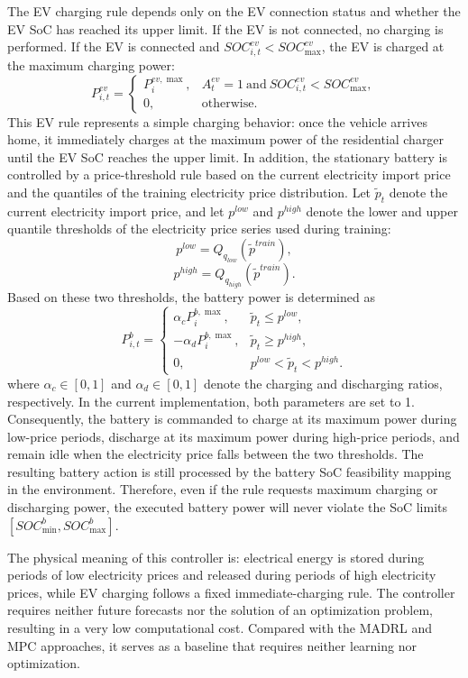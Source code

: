 The EV charging rule depends only on the EV connection status and whether the EV SoC has reached its upper limit. If the EV is not connected, no charging is performed. If the EV is connected and \(SOC^{ev}_{i,t}<SOC^{ev}_{\max}\), the EV is charged at the maximum charging power:
\[
P^{ev}_{i,t}=
\left\{
\begin{array}{ll}
P^{ev,\max}_i, & A^{ev}_t=1\ \mathrm{and}\ SOC^{ev}_{i,t}<SOC^{ev}_{\max},\\
0, & \mathrm{otherwise}.
\end{array}
\right.
\]
This EV rule represents a simple charging behavior: once the vehicle arrives home, it immediately charges at the maximum power of the residential charger until the EV SoC reaches the upper limit. In addition, the stationary battery is controlled by a price-threshold rule based on the current electricity import price and the quantiles of the training electricity price distribution. Let \(\tilde p_t\) denote the current electricity import price, and let \(p^{low}\) and \(p^{high}\) denote the lower and upper quantile thresholds of the electricity price series used during training:
\[
  p^{low}=Q_{q_{low}}(\tilde p^{train}),
\]
\[
  p^{high}=Q_{q_{high}}(\tilde p^{train}).
\]
Based on these two thresholds, the battery power is determined as
\[
P^b_{i,t}=
\left\{
\begin{array}{ll}
\alpha_c P^{b,\max}_i, & \tilde p_t\le p^{low},\\
-\alpha_d P^{b,\max}_i, & \tilde p_t\ge p^{high},\\
0, & p^{low}<\tilde p_t<p^{high}.
\end{array}
\right.
\]
where \(\alpha_c\in[0,1]\) and \(\alpha_d\in[0,1]\) denote the charging and discharging ratios, respectively. In the current implementation, both parameters are set to 1. Consequently, the battery is commanded to charge at its maximum power during low-price periods, discharge at its maximum power during high-price periods, and remain idle when the electricity price falls between the two thresholds. The resulting battery action is still processed by the battery SoC feasibility mapping in the environment. Therefore, even if the rule requests maximum charging or discharging power, the executed battery power will never violate the SoC limits \([SOC^b_{\min},SOC^b_{\max}]\).

The physical meaning of this controller is: electrical energy is stored during periods of low electricity prices and released during periods of high electricity prices, while EV charging follows a fixed immediate-charging rule. The controller requires neither future forecasts nor the solution of an optimization problem, resulting in a very low computational cost. Compared with the MADRL and MPC approaches, it serves as a baseline that requires neither learning nor optimization.
